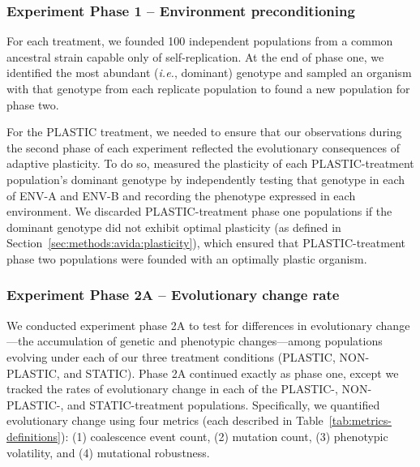 \begin{raggedbottom}
\subsubsection{Experiment Phase 1 -- Environment preconditioning}
\label{sec:methods:experiment:phase-one}

For each treatment, we founded 100 independent populations from a common ancestral strain capable only of self-replication.
At the end of phase one, we identified the most abundant (\textit{i.e.}, dominant) genotype and sampled an organism with that genotype from each replicate population to found a new population for phase two.

For the PLASTIC treatment, we needed to ensure that our observations during the second phase of each experiment reflected the evolutionary consequences of adaptive plasticity. 
To do so, measured the plasticity of each PLASTIC-treatment population's dominant genotype by independently testing that genotype in each of ENV-A and ENV-B and recording the phenotype expressed in each environment.
We discarded PLASTIC-treatment phase one populations if the dominant genotype did not exhibit optimal plasticity (as defined in Section~\ref{sec:methods:avida:plasticity}), which ensured that PLASTIC-treatment phase two populations were founded with an optimally plastic organism.


\subsubsection{Experiment Phase 2A -- Evolutionary change rate}
\label{sec:methods:exp:evolutionary-change-rate}

We conducted experiment phase 2A to test for differences in evolutionary change---the accumulation of genetic and phenotypic changes---among populations evolving under each of our three treatment conditions (PLASTIC, NON-PLASTIC, and STATIC). 
Phase 2A continued exactly as phase one, except we tracked the rates of evolutionary change in each of the PLASTIC-, NON-PLASTIC-, and STATIC-treatment populations.
Specifically, we quantified evolutionary change using four metrics (each described in Table~\ref{tab:metrics-definitions}):
(1) coalescence event count,
(2) mutation count,
(3) phenotypic volatility,
and (4) mutational robustness.


\end{raggedbottom}
